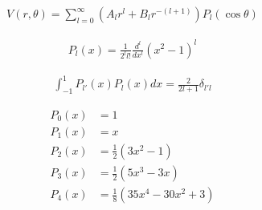 \begin{align*}
	V(r, \theta) = \sum_{l=0}^{\infty} (A_l r^l + B_l r^{-(l+1)}) P_l(\cos \theta)
\end{align*}

\begin{align*}
	P_l(x) = \frac{1}{2^l l!} \frac{d^l}{dx^l} (x^2-1)^l
\end{align*}

\begin{align*}
	\int_{-1}^{1} P_{l'}(x)P_l(x) dx = \frac{2}{2l+1} \delta_{l' l}
\end{align*}

\begin{align*}
	P_0(x) &= 1 \\
	P_1(x) &= x \\
	P_2(x) &= \tfrac{1}{2}(3x^2-1) \\
	P_3(x) &= \tfrac{1}{2}(5x^3-3x) \\
	P_4(x) &= \tfrac{1}{8}(35x^4-30x^2+3) \\
\end{align*}
